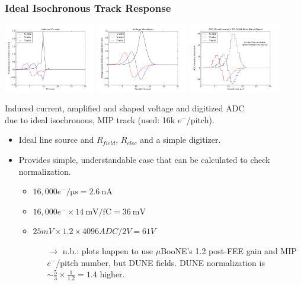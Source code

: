 \documentclass[xcolor=dvipsnames]{beamer}
\begin{document}
\begin{frame}[fragile]
  \frametitle{Ideal Isochronous Track Response}
  
  \begin{center}
    \includegraphics[width=0.3\textwidth]{dune-current.pdf}%
    \includegraphics[width=0.3\textwidth]{dune-voltage.pdf}%
    \includegraphics[width=0.3\textwidth]{dune-adc.pdf}

    \scriptsize Induced current, amplified and shaped voltage and
    digitized ADC \\
    due to ideal isochronous, MIP track (used: 16k $e^-$/pitch).
  \end{center}
  \begin{itemize}
  \item Ideal line source and $R_{field}$, $R_{elec}$ and a simple digitizer.
  \item Provides simple, understandable case that can be calculated to
    check normalization.
    \begin{itemize}\footnotesize
    \item $16,000 e^- / \si{\micro\second} = \SI{2.6}{\nano\ampere}$
    \item $16,000 e^- \times \SI{14}{\milli\volt/\femto\coulomb} = \SI{36}{\milli\volt}$
    \item $25 mV \times 1.2 \times 4096 ADC / 2V = 61V$
      \begin{itemize}\tiny
      \item[$\to$] n.b.: plots happen to use $\mu$BooNE's 1.2 post-FEE
        gain and MIP $e^-$/pitch number, but DUNE fields.  DUNE
        normalization is $\sim\frac{5}{3}\times\frac{1}{1.2} = 1.4$ higher.
      \end{itemize}
    \end{itemize}
  \end{itemize}
\end{frame}
\end{document}

